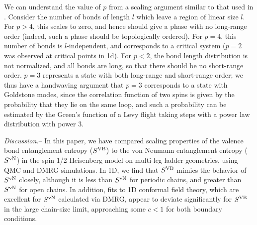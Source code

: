 \documentclass[prl,aps,twocolumn,floatfix,amsmath,amssymb,superscriptaddress,tightenlines]{revtex4}
\begin{document}
We can understand the value of $p$ from a scaling argument similar to that used in \cite{network}.
Consider the number of bonds of length $l$ which leave a region of linear size $l$.  For $p>4$, this
scales to zero, and hence should give a phase with no long-range order (indeed, such a phase should
be topologically ordered).  For $p=4$, this number of bonds is $l$-independent, and corresponds to a critical
system ($p=2$ was observed at critical points in 1d\cite{1dcritical}).
For $p<2$, the bond length distribution is not normalized, and all bonds are long, so that
there should be no short-range order.  $p=3$ represents a state with both long-range
and short-range order; we thus have a handwaving argument that $p=3$ corresponds to a state
with Goldstone modes, since the correlation function of two spins is given by the
probability that they lie on the same loop, and such a probability can be estimated by
the Green's function of a Levy flight taking steps with a power law distribution with power $3$.



{\it Discussion.}-- In this paper, we have compared scaling properties of
the valence bond entanglement entropy ($S^{\rm VB}$) \cite{Alet,Chh} to the von Neumann entanglement entropy ($S^{ \rm vN}$) in the
spin 1/2 Heisenberg model on multi-leg ladder geometries, using QMC and DMRG simulations.
In 1D, we find
that $S^{\rm VB}$ mimics the behavior of $S^{ \rm vN}$ closely, although 
it is less than $S^{ \rm vN}$ for periodic
chains, and greater than $S^{ \rm vN}$ for open chains. In addition, fits to
1D conformal field theory, which are excellent for $S^{ \rm vN}$ calculated
via DMRG, appear to deviate significantly for $S^{\rm VB}$ in the large
chain-size limit, approaching some $c<1$ for both boundary conditions.

\end{document}
